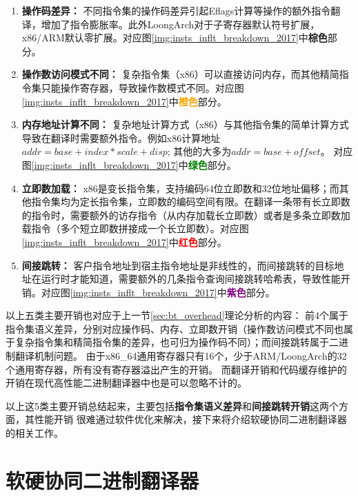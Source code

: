 \begin{enumerate}
  \item \textbf{操作码差异：} 不同指令集的操作码差异引起Eflags计算等操作的额外指令翻译，增加了指令膨胀率。此外LoongArch对于子寄存器默认符号扩展，x86/ARM默认零扩展。对应图\ref{img:insts_inflt_breakdown_2017}中\textcolor{Sepia}{\textbf{棕色}}部分。
  
  \item \textbf{操作数访问模式不同：} 复杂指令集（x86）可以直接访问内存，而其他精简指令集只能操作寄存器，导致操作数模式不同。对应图\ref{img:insts_inflt_breakdown_2017}中\textcolor{orange}{\textbf{橙色}}部分。
  
  \item \textbf{内存地址计算不同：} 复杂地址计算方式（x86）与其他指令集的简单计算方式导致在翻译时需要额外指令。例如x86计算地址$addr = base + index * scale +disp$; 其他的大多为$addr = base + offset$。 对应图\ref{img:insts_inflt_breakdown_2017}中\textcolor{green}{\textbf{绿色}}部分。
  
  \item \textbf{立即数加载：} x86是变长指令集，支持编码64位立即数和32位地址偏移；而其他指令集均为定长指令集，立即数的编码空间有限。在翻译一条带有长立即数的指令时，需要额外的访存指令（从内存加载长立即数）或者是多条立即数加载指令（多个短立即数拼接成一个长立即数）。对应图\ref{img:insts_inflt_breakdown_2017}中\textcolor{red}{\textbf{红色}}部分。
  
  \item \textbf{间接跳转：} 客户指令地址到宿主指令地址是非线性的，而间接跳转的目标地址在运行时才能知道，需要额外的几条指令查询间接跳转哈希表，导致性能开销。对应图\ref{img:insts_inflt_breakdown_2017}中\textcolor{Purple}{\textbf{紫色}}部分。
  
\end{enumerate}

以上五类主要开销也对应于上一节\ref{sec:bt_overhead}理论分析的内容：
前4个属于指令集语义差异，分别对应操作码、内存、立即数开销（操作数访问模式不同也属于复杂指令集和精简指令集的差异，也可归为操作码不同）；而间接跳转属于二进制翻译机制问题。
由于x86\_64通用寄存器只有16个，少于ARM/LoongArch的32个通用寄存器，所有没有寄存器溢出产生的开销。
而翻译开销和代码缓存维护的开销在现代高性能二进制翻译器中也是可以忽略不计的。

以上这5类主要开销总结起来，主要包括\textbf{指令集语义差异}和\textbf{间接跳转开销}这两个方面，其性能开销
很难通过软件优化来解决，接下来将介绍软硬协同二进制翻译器的相关工作。

\section{软硬协同二进制翻译器}


